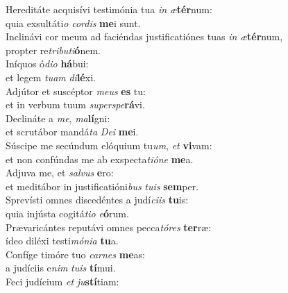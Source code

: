 \oddverse Hereditáte acquisívi testimónia tua \textit{in} \textit{æ}\textbf{tér}num:~\*\\
\oddverse quia exsultáti\textit{o} \textit{cor}\textit{dis} \textbf{me}i sunt.\\
\evenverse Inclinávi cor meum ad faciéndas justificatiónes tuas \textit{in} \textit{æ}\textbf{tér}num,~\*\\
\evenverse propter re\textit{tri}\textit{bu}\textit{ti}\textbf{ó}nem.\\
\oddverse Iníquos ó\textit{di}\textit{o} \textbf{há}bui:~\*\\
\oddverse et legem \textit{tu}\textit{am} \textit{di}\textbf{lé}xi.\\
\evenverse Adjútor et suscéptor \textit{me}\textit{us} \textbf{es} tu:~\*\\
\evenverse et in verbum tuum \textit{su}\textit{per}\textit{spe}\textbf{rá}vi.\\
\oddverse Declináte a \textit{me}, \textit{ma}\textbf{lí}gni:~\*\\
\oddverse et scrutábor mandá\textit{ta} \textit{De}\textit{i} \textbf{me}i.\\
\evenverse Súscipe me secúndum elóquium tu\textit{um}, \textit{et} \textbf{vi}vam:~\*\\
\evenverse et non confúndas me ab exspecta\textit{ti}\textit{ó}\textit{ne} \textbf{me}a.\\
\oddverse Adjuva me, et \textit{sal}\textit{vus} \textbf{e}ro:~\*\\
\oddverse et meditábor in justificatióni\textit{bus} \textit{tu}\textit{is} \textbf{sem}per.\\
\evenverse Sprevísti omnes discedéntes a judí\textit{ci}\textit{is} \textbf{tu}is:~\*\\
\evenverse quia injústa cogitá\textit{ti}\textit{o} \textit{e}\textbf{ó}rum.\\
\oddverse Prævaricántes reputávi omnes pecca\textit{tó}\textit{res} \textbf{ter}ræ:~\*\\
\oddverse ídeo diléxi testi\textit{mó}\textit{ni}\textit{a} \textbf{tu}a.\\
\evenverse Confíge timóre tuo \textit{car}\textit{nes} \textbf{me}as:~\*\\
\evenverse a judíciis e\textit{nim} \textit{tu}\textit{is} \textbf{tí}mui.\\
\oddverse Feci judícium \textit{et} \textit{ju}\textbf{stí}tiam:~\*\\
